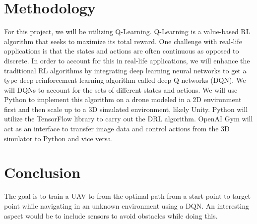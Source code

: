 \documentclass[conf]{new-aiaa}
\begin{document}
\section{Methodology}

For this project, we will be utilizing Q-Learning. Q-Learning is a value-based RL algorithm that seeks to maximize its total reward. One challenge with real-life applications is that the states and actions are often continuous as opposed to discrete. In order to account for this in real-life applications, we will enhance the traditional RL algorithms by integrating deep learning neural networks to get a type deep reinforcement learning algorithm called deep Q-networks (DQN). We will DQNs to account for the sets of different states and actions. We will use Python to implement this algorithm on a drone modeled in a 2D environment first and then scale up to a 3D simulated environment, likely Unity. Python will utilize the TensorFlow library to carry out the DRL algorithm. OpenAI Gym will act as an interface to transfer image data and control actions from the 3D simulator to Python and vice versa. 


\section{Conclusion}

The goal is to train a UAV to from the optimal path from a start point to target point while navigating in an unknown environment using a DQN. An interesting aspect would be to include sensors to avoid obstacles while doing this. 


\nocite{Anwar2019}
\nocite{Araar2016}
\nocite{Carrio2017}
\nocite{Madaan}
\nocite{Pham2018}
\nocite{Rodriguez2018}
\nocite{Shin2019}





%
\end{document}
